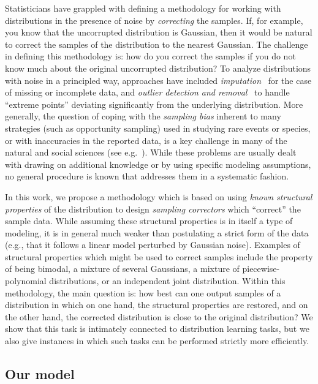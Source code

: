 Statisticians have grappled with defining a methodology for working with distributions in the presence of noise by  \emph{correcting} the samples. If, for example, you know that the uncorrupted distribution is Gaussian, then it would be natural to correct the samples
of the distribution to  the nearest Gaussian. The challenge in defining this methodology is: how do you correct the samples if you do not know much about the original uncorrupted distribution?   
To analyze distributions with noise in a principled way, approaches have included \emph{imputation}~\cite{book:imputation,book:incomplete:data,SMP:07} for the case of missing or incomplete data, and \emph{outlier detection and removal}~\cite{book:outliers,article:outliers,book:outliers:detect} to handle ``extreme points'' deviating significantly from the underlying distribution. More generally, the question of coping with the \emph{sampling bias} inherent to many strategies (such as opportunity sampling) used in studying rare events or species, or with inaccuracies in the reported data, is a key challenge in many of the natural and social sciences (see e.g.~\cite{Signor:1982,Senese:03,Scholarpedia:2008}). While these problems are usually dealt with drawing on additional knowledge or by using specific modeling assumptions, no general procedure is known that addresses them in a systematic fashion.

In this work, we propose a  methodology which is 
based on using  \emph{known structural properties} of the distribution
to design  \emph{sampling correctors} which
``correct'' the sample data. 
While assuming these structural properties is in itself a type of modeling, it is in general much weaker than postulating a strict form of the data (e.g., that it follows a linear model perturbed by Gaussian noise).
Examples of structural properties  which might be used to
correct samples include the property of being
bimodal, a mixture of several Gaussians, a mixture of piecewise-polynomial distributions, or an independent joint distribution.
Within this methodology, the main
question is: how best can one output samples of a distribution in which
on one hand, the structural properties are restored, and on the other hand,
the corrected distribution is close to the original distribution?
We show that this task is intimately connected
to distribution learning tasks, 
but we also give instances in which
such tasks can be performed strictly more efficiently.


\subsection{Our model}

